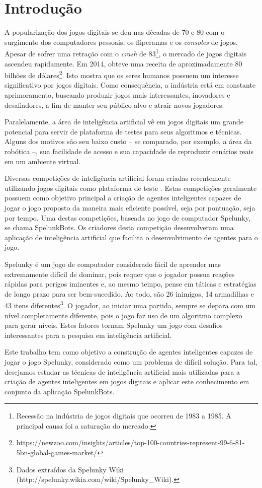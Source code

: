\chapter{\label{chap:introduction}Introdução}
A popularização dos jogos digitais se deu nas décadas de 70 e 80 com o
surgimento dos computadores pessoais, os fliperamas e os \textit{consoles} de
jogos. Apesar de sofrer uma retração com o \textit{crash} de
83\footnote{Recessão na indústria de jogos digitais que ocorreu de 1983 a 1985.
A principal causa foi a saturação do mercado.}, o mercado de jogos digitais
ascendeu rapidamente. Em 2014, obteve uma receita de aproximadamente 80 bilhões
de
dólares\footnote{https://newzoo.com/insights/articles/top-100-countries-represent-99-6-81-5bn-global-games-market/}.
Isto mostra que os seres humanos possuem um interesse significativo por jogos
digitais. Como consequência, a indústria está em constante aprimoramento,
buscando produzir jogos mais interessantes, inovadores e desafiadores, a fim de
manter seu público alvo e atrair novos jogadores.

Paralelamente, a área de inteligência artificial vê em jogos digitais um grande
potencial para servir de plataforma de testes para seus algoritmos e técnicas.
Alguns dos motivos são seu baixo custo -- se comparado, por exemplo, a área da
robótica --, sua facilidade de acesso e sua capacidade de reproduzir cenários
reais em um ambiente virtual.

Diversas competições de inteligência artificial foram criadas recentemente
utilizando jogos digitais como plataforma de teste \cite{GameAiCompetition}.
Estas competições geralmente possuem como objetivo principal a criação de
agentes inteligentes capazes de jogar o jogo proposto da maneira mais eficiente
possível, seja por pontuação, seja por tempo. Uma destas competições, baseada no
jogo de computador Spelunky, se chama SpelunkBots. Os criadores desta competição
desenvolveram uma aplicação de inteligência artificial que facilita o
desenvolvimento de agentes para o jogo.

Spelunky é um jogo de computador considerado fácil de aprender mas extremamente
difícil de dominar, pois requer que o jogador possua reações rápidas para
perigos iminentes e, ao mesmo tempo, pense em táticas e estratégias de longo
prazo para ser bem-sucedido. Ao todo, são 26 inimigos, 14 armadilhas e 43 itens
diferentes\footnote{Dados extraídos da Spelunky Wiki
(http://spelunky.wikia.com/wiki/Spelunky\_Wiki).}. O jogador, ao iniciar uma
partida, sempre se depara com um nível completamente diferente, pois o jogo faz
uso de um algoritmo complexo para gerar níveis. Estes fatores tornam Spelunky um
jogo com desafios interessantes para a pesquisa em inteligência artificial.

Este trabalho tem como objetivo a construção de agentes inteligentes capazes de
jogar o jogo Spelunky, considerado como um problema de difícil solução. Para
tal, desejamos estudar as técnicas de inteligência artificial mais utilizadas
para a criação de agentes inteligentes em jogos digitais e aplicar este
conhecimento em conjunto da aplicação SpelunkBots.

